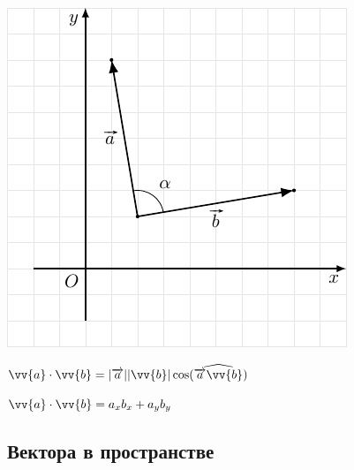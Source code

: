 \documentclass[10pt]{beamer}
\begin{document}
    {
    	{
    		
			\includegraphics{scalarpr.pdf}
    		
    		
    	}
    	{
    		$\vv{a} \cdot \vv{b} = |\vect{a}||\vv{b}|\cos(\widehat{\vect{a}  \vv{b}})$ 
    		
    		\hfill
    		
    		$\vv{a} \cdot \vv{b} = a_xb_x + a_yb_y $
    		
    	}
    	
    }
	
	


\subsection{Вектора в пространстве}
\end{document}
